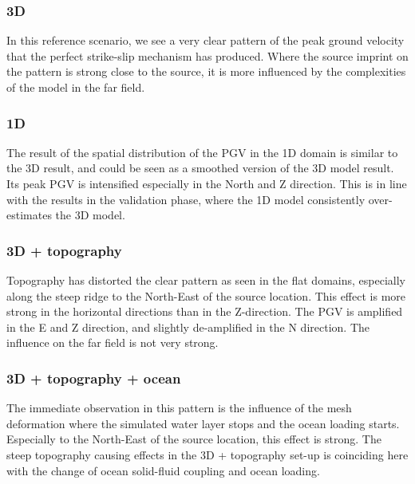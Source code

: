 \documentclass[../Text/00main.tex]{subfiles}
\begin{document}
\subsubsection{3D}

In this reference scenario, we see a very clear pattern of the peak ground velocity that the perfect strike-slip mechanism has produced. Where the source imprint on the pattern is strong close to the source, it is more influenced by the complexities of the model in the far field.

\subsubsection{1D}

The result of the spatial distribution of the PGV in the 1D domain is similar to the 3D result, and could be seen as a smoothed version of the 3D model result. Its peak PGV is intensified especially in the North and Z direction. This is in line with the results in the validation phase, where the 1D model consistently over-estimates the 3D model. 

\subsubsection{3D + topography}

Topography has distorted the clear pattern as seen in the flat domains, especially along the steep ridge to the North-East of the source location. This effect is more strong in the horizontal directions than in the Z-direction. The PGV is amplified in the E and Z direction, and slightly de-amplified in the N direction. The influence on the far field is not very strong. 

\subsubsection{3D + topography + ocean}

The immediate observation in this pattern is the influence of the mesh deformation where the simulated water layer stops and the ocean loading starts. Especially to the North-East of the source location, this effect is strong. The steep topography causing effects in the 3D + topography set-up is coinciding here with the change of ocean solid-fluid coupling and ocean loading.
\end{document}
